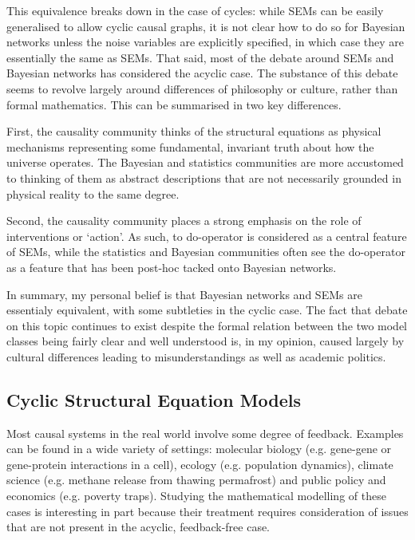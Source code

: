 This equivalence breaks down in the case of cycles: while SEMs can be easily generalised to allow cyclic causal graphs, it is not clear how to do so for Bayesian networks unless the noise variables are explicitly specified, in which case they are essentially the same as SEMs.
That said, most of the debate around SEMs and Bayesian networks has considered the acyclic case.
The substance of this debate seems to revolve largely around differences of philosophy or culture, rather than formal mathematics.
This can be summarised in two key differences.

First, the causality community thinks of the structural equations as physical mechanisms representing some fundamental, invariant truth about how the universe operates. 
The Bayesian and statistics communities are more accustomed to thinking of them as abstract descriptions that are not necessarily grounded in physical reality to the same degree.

Second, the causality community places a strong emphasis on the role of interventions or `action'.
As such, to do-operator is considered as a central feature of SEMs, while the statistics and Bayesian communities often see the do-operator as a feature that has been post-hoc tacked onto Bayesian networks.

In summary, my personal belief is that Bayesian networks and SEMs are essentialy equivalent, with some subtleties in the cyclic case. 
The fact that debate on this topic continues to exist despite the formal relation between the two model classes being fairly clear and well understood is, in my opinion, caused largely by cultural differences leading to misunderstandings as well as academic politics.

\subsection{Cyclic Structural Equation Models}

Most causal systems in the real world involve some degree of feedback. 
Examples can be found in a wide variety of settings: molecular biology (e.g. gene-gene or gene-protein interactions in a cell), ecology (e.g. population dynamics), climate science (e.g. methane release from thawing permafrost) and public policy and economics (e.g. poverty traps).
Studying the mathematical modelling of these cases is interesting in part because their treatment requires consideration of issues that are not present in the acyclic, feedback-free case.

